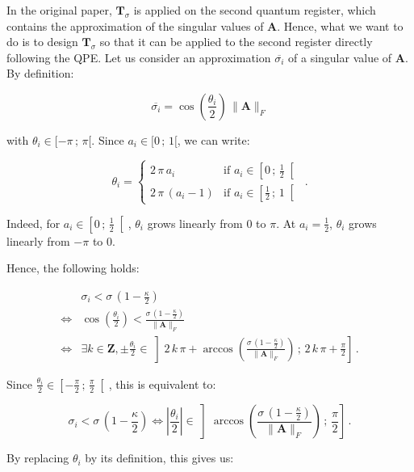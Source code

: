 \documentclass[11pt, a4paper]{article}
\begin{document}
            In the original paper, \(\mathbf{T}_\sigma\) is applied on the second quantum register, which contains the approximation of the singular values of \(\mathbf{A}\). Hence, what we want to do is to design \(\mathbf{T}_\sigma\) so that it can be applied to the second register directly following the QPE. Let us consider an approximation \(\overline{\sigma_i}\) of a singular value of \(\mathbf{A}\). By definition:
            
            \[\overline{\sigma_i}=\cos\left(\frac{\theta_i}{2}\right)\,\|\mathbf{A}\|_F\]
            
            with \(\theta_i\in[-\pi\,;\,\pi[\). Since \(a_i\in[0\,;\,1[\), we can write:
            
            \[\theta_i = \begin{cases}2\,\pi\,a_i&\text{if }a_i\in\left[0\,;\,\frac12\right[\\2\,\pi\,\left(a_i-1\right)&\text{if }a_i\in\left[\frac12\,;\,1\right[\end{cases}\,.\]
            
            Indeed, for \(a_i\in\left[0\,;\,\frac12\right[\), \(\theta_i\) grows linearly from \(0\) to \(\pi\). At \(a_i=\frac12\), \(\theta_i\) grows linearly from \(-\pi\) to \(0\).
            
            Hence, the following holds:
            
            \begin{align*}
                &\sigma_i < \sigma\,\left(1 - \frac\kappa2\right)\\
                \iff&\cos\left(\frac{\theta_i}{2}\right) < \frac{\sigma\,\left(1 - \frac\kappa2\right)}{\|\mathbf{A}\|_F}\\
                \iff&\exists k\in\mathbf{Z},\pm\frac{\theta_i}{2}\in\left]2\,k\,\pi + \arccos\left(\frac{\sigma\,\left(1 - \frac\kappa2\right)}{\|\mathbf{A}\|_F}\right)\,;\,2\,k\,\pi + \frac\pi2\right]\,.
            \end{align*}
            
            Since \(\frac{\theta_i}{2}\in\left[-\frac\pi2\,;\,\frac\pi2\right[\), this is equivalent to:
            
            \[\sigma_i < \sigma\,\left(1 - \frac\kappa2\right)\iff\left|\frac{\theta_i}{2}\right|\in\left]\arccos\left(\frac{\sigma\,\left(1 - \frac\kappa2\right)}{\|\mathbf{A}\|_F}\right)\,;\,\frac\pi2\right]\,.\]
            
            By replacing \(\theta_i\) by its definition, this gives us:
            
\end{document}
